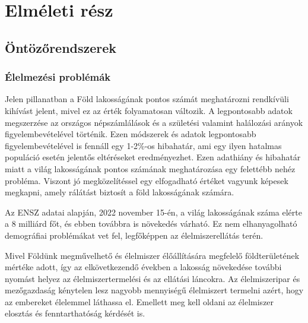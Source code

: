 \documentclass[a4paper,oneside,onecolumn,12pt]{LegrandOrangeBook}
\begin{document}
\chapter{Elméleti rész}
\section{Öntözőrendszerek}
\subsection{Élelmezési problémák}
	Jelen pillanatban a Föld lakosságának pontos számát meghatározni rendkívüli kihívást jelent, mivel ez az érték folyamatosan változik. A legpontosabb adatok megszerzése az országos népszámlálások és a születési valamint halálozási arányok figyelembevételével történik. Ezen módszerek és adatok legpontosabb figyelembevételével is fennáll egy 1-2\%-os hibahatár, ami egy ilyen hatalmas populáció esetén jelentős eltéréseket eredményezhet. Ezen adathiány és hibahatár miatt a világ lakosságának pontos számának meghatározása egy felettébb nehéz probléma. Viszont jó megközelítéssel egy elfogadható értéket vagyunk képesek megkapni, amely rálátást biztosít a föld lakosságának számára. 

	Az ENSZ adatai alapján, 2022 november 15-én, a világ lakosságának száma elérte a 8 milliárd főt, és ebben továbbra is növekedés várható. Ez nem elhanyagolható demográfiai problémákat vet fel, legfőképpen az élelmiszerellátás terén. 

	Mivel Földünk megművelhető és élelmiszer élőállítására megfelelő földterületének mértéke adott, így az elkövetkezendő években a lakosság növekedése további nyomást helyez az élelmiszertermelési és az ellátási láncokra. Az élelmiszeripar és mezőgazdaság kénytelen lesz nagyobb mennyiségű élelmiszert termelni azért, hogy az embereket élelemmel láthassa el. Emellett meg kell oldani az élelmiszer elosztás és fenntarthatóság kérdését is.
\end{document}
